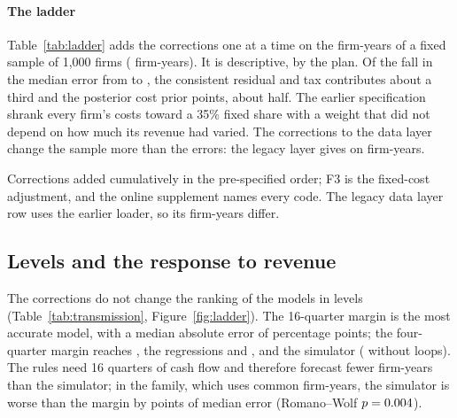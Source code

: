 \documentclass[preprint,12pt,authoryear]{elsarticle}
\begin{document}
\paragraph{The ladder} Table~\ref{tab:ladder} adds the corrections one at a time on the firm-years of a fixed sample of 1{,}000 firms (\LadN{} firm-years). It is descriptive, by the plan. Of the fall in the median error from \LadPreExact{} to \LadThreeDef, the consistent residual and tax contributes about a third and the posterior cost prior \LadOneDrop{} points, about half. The earlier specification shrank every firm's costs toward a 35\% fixed share with a weight that did not depend on how much its revenue had varied. The corrections to the data layer change the sample more than the errors: the legacy layer gives \LadLegacy{} on \LadLegacyN{} firm-years.

\begin{table}[t]
\centering\scriptsize
\caption{The ladder of corrections (descriptive; firm-years of a fixed sample of 1{,}000 firms)}
\label{tab:ladder}

\par\smallskip
\begin{minipage}{\linewidth}\footnotesize
Corrections added cumulatively in the pre-specified order; F3 is the fixed-cost adjustment, and the online supplement names every code. The legacy data layer row uses the earlier loader, so its firm-years differ.
\end{minipage}
\end{table}

\subsection{Levels and the response to revenue}
The corrections do not change the ranking of the models in levels (Table~\ref{tab:transmission}, Figure~\ref{fig:ladder}). The 16-quarter margin is the most accurate model, with a median absolute error of \TrMaeNthree{} percentage points; the four-quarter margin reaches \TrMaeNone, the regressions \TrMaeNfive{} and \TrMaeNsix, and the simulator \TrMaeTone{} (\TrMaeTzero{} without loops). The rules need 16 quarters of cash flow and therefore forecast fewer firm-years than the simulator; in the family, which uses common firm-years, the simulator is worse than the margin by \FamTwinMedDiff{} points of median error (Romano--Wolf $p=0.004$).
\end{document}
